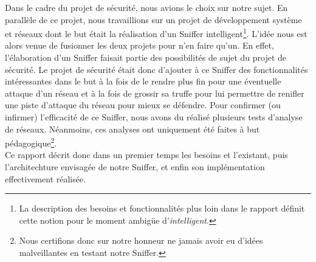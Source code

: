 Dans le cadre du projet de sécurité, nous avions le choix sur notre sujet. En parallèle de ce projet, nous travaillions sur un projet de développement système et réseaux dont le but était la réalisation d'un Sniffer intelligent\footnote{La description des besoins et fonctionnalités plus loin dans le rapport définit cette notion pour le moment ambigüe d'\emph{intelligent}.}. L'idée nous est alors venue de fusionner les deux projets pour n'en faire qu'un. En effet, l'élaboration d'un Sniffer faisait partie des possibilités de sujet du projet de sécurité. Le projet de sécurité était donc d'ajouter à ce Sniffer des fonctionnalités intéressantes dans le but à la fois de le rendre plus fin pour une éventuelle attaque d'un réseau et à la fois de grossir sa truffe pour lui permettre de renifler une piste d'attaque du réseau pour mieux se défendre. Pour confirmer (ou infirmer) l'efficacité de ce Sniffer, nous avons du réalisé plusieurs tests d'analyse de réseaux. Néanmoins, ces analyses ont uniquement été faites à but pédagogique\footnote{Nous certifions donc sur notre honneur ne jamais avoir eu d'idées malveillantes en testant notre Sniffer.}.\\

 Ce rapport décrit donc dans un premier temps les besoins et l'existant, puis l'architechture envisagée de notre Sniffer, et enfin son implémentation effectivement réalisée.
